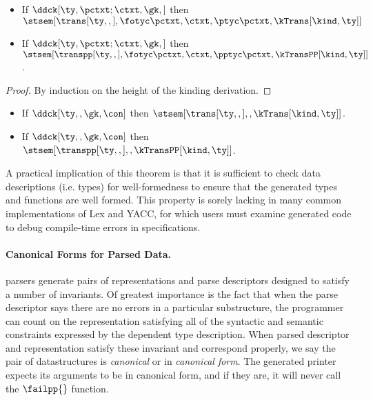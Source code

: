\begin{lemma}
\label{thm:type-correctness}
\begin{itemize}
\item If $\ddck[\ty,{\pctxt;\ctxt},\gk,{}]$ then
  $\stsem[{\trans[\ty,,]},{\fotyc \pctxt, \ctxt,\ptyc \pctxt},
            {\kTrans[\kind,\ty]}]$
\item If $\ddck[\ty,{\pctxt;\ctxt},\gk,{}]$ then
  $\stsem[{\transpp[\ty,,]},{\fotyc \pctxt, \ctxt,\pptyc \pctxt},
            {\kTransPP[\kind,\ty]}]$.
\end{itemize}  
\end{lemma}

\begin{proof}
  By induction on the height of the kinding derivation.
\end{proof}

\begin{theorem}
  \begin{itemize}
  \item If $\ddck[\ty,,\gk,\con]$ then
    $\stsem[{\trans[\ty,,]},,\kTrans[\kind,\ty]]$.
  \item If $\ddck[\ty,,\gk,\con]$ then
    $\stsem[{\transpp[\ty,,]},,\kTransPP[\kind,\ty]]$.
  \end{itemize}  
\end{theorem}

A practical implication of this theorem is that
it is sufficient to check data descriptions (i.e. \ddc{} types) for
well-formedness to ensure that the generated types and
functions are well formed. This property is sorely lacking in many
common implementations of Lex and YACC, for which users must examine
generated code to debug compile-time errors in
specifications.

\paragraph*{Canonical Forms for Parsed Data.}
\ddc{} parsers generate pairs of representations and parse descriptors
designed to satisfy a number of invariants.  Of greatest importance is 
the fact that
when the parse descriptor says there are no errors in a particular
substructure, the programmer can count on the representation
satisfying all of the syntactic and semantic
constraints expressed by the dependent
\ddc{} type description.  When parsed descriptor and representation
satisfy these invariant and correspond properly, we say the pair
of datastructures is {\em canonical} or in {\em canonical form}.
The generated printer expects its arguments to be in canonical form,
and if they are, it will never call the $\failpp{}$ function.

